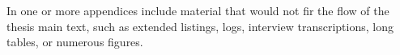 In one or more appendices include material that would not fir
the flow of the thesis main text, such as
extended listings,
logs,
interview transcriptions,
long tables, or
numerous figures.
